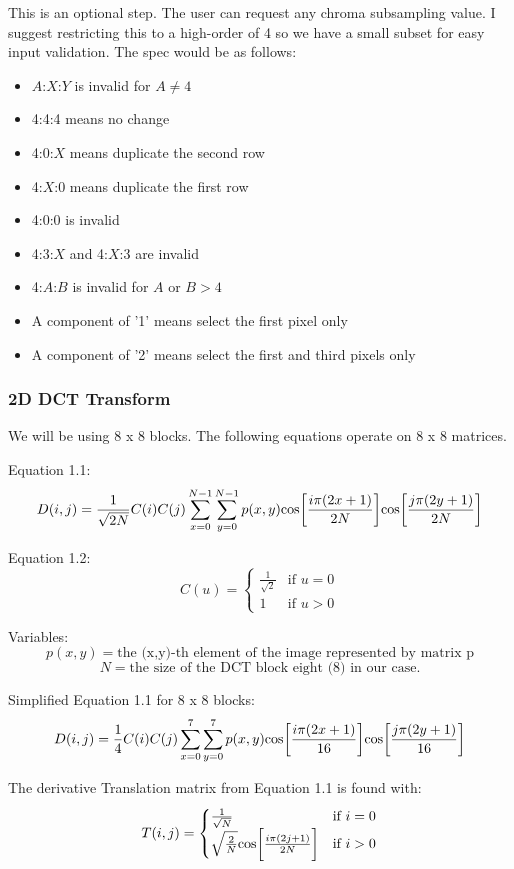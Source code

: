 \documentclass{article}
\begin{document}
This is an optional step.  The user can request any chroma
subsampling value.  I suggest restricting this to a high-order
of 4 so we have a small subset for easy input validation.
The spec would be as follows:
\begin{itemize}
	\item $A$:$X$:$Y$ is invalid for $A \neq 4$
	\item 4:4:4 means no change
	\item 4:0:$X$ means duplicate the second row
	\item 4:$X$:0 means duplicate the first row
	\item 4:0:0 is invalid
	\item 4:3:$X$ and 4:$X$:3 are invalid
	\item 4:$A$:$B$ is invalid for $A$ or $B > 4$
	\item A component of '1' means select the first pixel only
	\item A component of '2' means select the first and third pixels only
\end{itemize}

\subsubsection{2D DCT Transform}

We will be using 8 x 8 blocks.
The following equations operate on 8 x 8 matrices.

Equation 1.1:
\[
D(i,j) = \frac{1}{\sqrt{2N}} C(i) C(j)
\sum\limits_{x=0}^{N-1}
\sum\limits_{y=0}^{N-1}
p(x,y)
\text{cos}\bigg{[}
\frac{i\pi(2x + 1)}{2N}
\bigg{]}
\text{cos}\bigg{[}
\frac{j\pi(2y + 1)}{2N}
\bigg{]}
\]

Equation 1.2:
\[
C(u) =
\begin{cases}
\frac{1}{\sqrt{2}} & \text{if\ } u = 0 \\
1 & \text{if\ } u > 0
\end{cases}
\]

Variables:
\[
p(x,y) = \text{the (x,y)-th element of the image represented by matrix p}
\]
\[
N = \text{the size of the DCT block eight (8) in our case.}
\]

Simplified Equation 1.1 for 8 x 8 blocks:
\[
D(i,j) = \frac{1}{4} C(i) C(j)
\sum\limits_{x=0}^{7}
\sum\limits_{y=0}^{7}
p(x,y)
\text{cos}\bigg{[}
\frac{i\pi(2x + 1)}{16}
\bigg{]}
\text{cos}\bigg{[}
\frac{j\pi(2y + 1)}{16}
\bigg{]}
\]

The derivative Translation matrix from Equation 1.1 is found with:
\[
T(i,j) =
\begin{cases}
\frac{1}{\sqrt{N}} & \text{if\ } i = 0 \\
\sqrt{\frac{2}{N}} \text{cos}\bigg{[}\frac{i\pi(2j+1)}{2N}\bigg{]} & \text{if\ } i > 0
\end{cases}
\]
\end{document}
